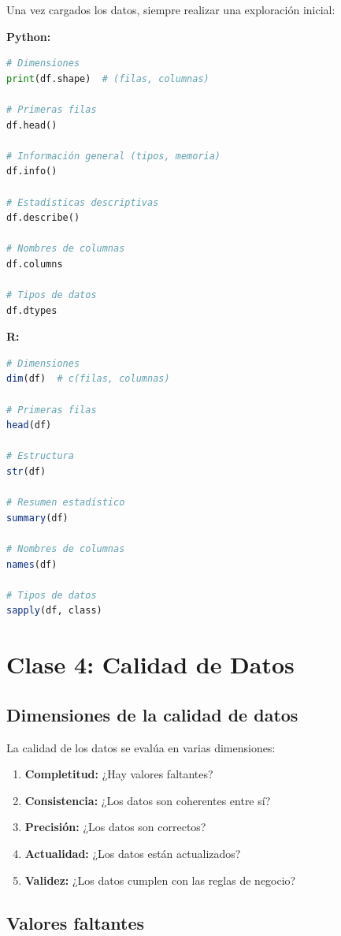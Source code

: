 \documentclass[a4paper,11pt]{article}
\begin{document}
Una vez cargados los datos, siempre realizar una exploración inicial:

\textbf{Python:}
\begin{lstlisting}[language=Python]
# Dimensiones
print(df.shape)  # (filas, columnas)

# Primeras filas
df.head()

# Información general (tipos, memoria)
df.info()

# Estadísticas descriptivas
df.describe()

# Nombres de columnas
df.columns

# Tipos de datos
df.dtypes
\end{lstlisting}

\textbf{R:}
\begin{lstlisting}[language=R]
# Dimensiones
dim(df)  # c(filas, columnas)

# Primeras filas
head(df)

# Estructura
str(df)

# Resumen estadístico
summary(df)

# Nombres de columnas
names(df)

# Tipos de datos
sapply(df, class)
\end{lstlisting}

\section{Clase 4: Calidad de Datos}

\subsection{Dimensiones de la calidad de datos}

La calidad de los datos se evalúa en varias dimensiones:

\begin{enumerate}
    \item \textbf{Completitud:} ¿Hay valores faltantes?
    \item \textbf{Consistencia:} ¿Los datos son coherentes entre sí?
    \item \textbf{Precisión:} ¿Los datos son correctos?
    \item \textbf{Actualidad:} ¿Los datos están actualizados?
    \item \textbf{Validez:} ¿Los datos cumplen con las reglas de negocio?
\end{enumerate}

\subsection{Valores faltantes}
\end{document}
